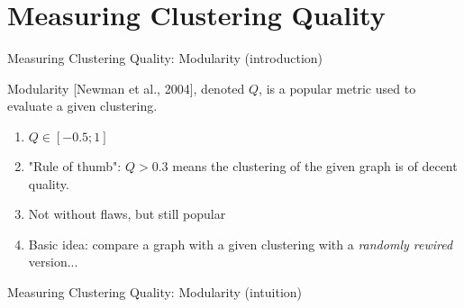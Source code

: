 \section{Measuring Clustering Quality}

\begin{frame}{Measuring Clustering Quality: Modularity (introduction)}

Modularity [Newman et al., 2004], denoted $Q$, is a popular metric used to evaluate a given clustering.
\begin{enumerate}
 \item<1-> $Q \in [-0.5; 1]$
 \item<2-> "Rule of thumb": $Q > 0.3$ means the clustering of the given graph is of decent quality.
 \item<3->{Not without flaws, but still popular}
 \item<4->{Basic idea: compare a graph with a given clustering with a \emph{randomly rewired} version...}
\end{enumerate}

\end{frame}

\begin{frame}{Measuring Clustering Quality: Modularity (intuition)}
\begin{figure}
  \caption{
    }
\end{figure}
\end{frame}

